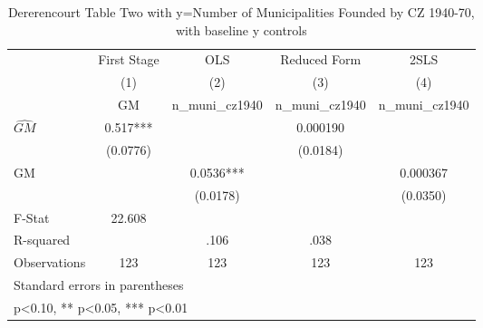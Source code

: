 \begin{table}[htbp]\centering
\def\sym#1{\ifmmode^{#1}\else\(^{#1}\)\fi}
\caption{Dererencourt Table Two with y=Number of Municipalities Founded by CZ 1940-70, with baseline y controls}
\begin{tabular}{l*{4}{c}}
\toprule
                    & First Stage   &         OLS   &Reduced Form   &        2SLS   \\
                    &\multicolumn{1}{c}{(1)}&\multicolumn{1}{c}{(2)}&\multicolumn{1}{c}{(3)}&\multicolumn{1}{c}{(4)}\\
                    &\multicolumn{1}{c}{GM}&\multicolumn{1}{c}{n\_muni\_cz1940}&\multicolumn{1}{c}{n\_muni\_cz1940}&\multicolumn{1}{c}{n\_muni\_cz1940}\\
\midrule
$\hat{GM}$          &       0.517***&               &    0.000190   &               \\
                    &    (0.0776)   &               &    (0.0184)   &               \\
\addlinespace
GM                  &               &      0.0536***&               &    0.000367   \\
                    &               &    (0.0178)   &               &    (0.0350)   \\
\midrule
F-Stat              &      22.608   &               &               &               \\
R-squared           &               &        .106   &        .038   &               \\
Observations        &         123   &         123   &         123   &         123   \\
\bottomrule
\multicolumn{5}{l}{\footnotesize Standard errors in parentheses}\\
\multicolumn{5}{l}{\footnotesize * p<0.10, ** p<0.05, *** p<0.01}\\
\end{tabular}
\end{table}
